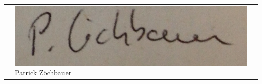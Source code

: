 \documentclass[11pt]{article}
\begin{document}
\begin{center}
\begin{tabular}{@{}p{4cm}@{}p{4cm}@{}@{}p{4cm}@{}}
\begin{minipage}{4cm}
\end{minipage}

&

\begin{minipage}{4cm}


\includegraphics[scale=0.13]{patrick.png}
\large \newline Patrick Z\"ochbauer

\end{minipage}
\end{tabular}


\end{center}
\newpage

\end{document}
